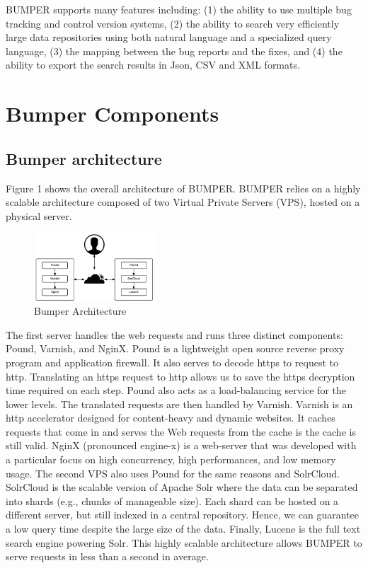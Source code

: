 \documentclass[conference]{IEEEtran}
\begin{document}
BUMPER supports many features including: (1) the ability to use multiple bug tracking and control version systems, (2) the ability to search very efficiently large data repositories using both natural language and a specialized query language, (3) the mapping between the bug reports and the fixes, and (4) the ability to export the search results in Json, CSV and XML formats.

\section{Bumper Components}
\label{sec:Bumper Components}

\subsection{Bumper architecture}
\label{sub:Bumper architecture}

Figure 1 shows the overall architecture of BUMPER. BUMPER relies on a highly scalable architecture composed of two Virtual Private Servers (VPS), hosted on a physical server.

\begin{figure}
  \centering
  \includegraphics[width=0.4\textwidth]{media/archi.png}
  \caption{Bumper Architecture}
\vspace{-1.8em}
\end{figure}

The first server handles the web requests and
runs three distinct components: Pound, Varnish, and NginX.
Pound is a lightweight open source reverse proxy program
and application firewall.
It also serves to decode https to request to http.
Translating an https request to http allows us to save the https decryption time required on each step.
Pound also acts as a load-balancing service for the lower levels.
The translated requests are then handled by Varnish.
Varnish is an http accelerator designed for content-heavy and dynamic websites.
It caches requests that come in and serves the Web requests from the cache is the cache is still valid.
NginX (pronounced engine-x) is a web-server that was developed with a particular focus on high concurrency, high performances, and low memory usage.
The second VPS also uses Pound for the same reasons and SolrCloud.
SolrCloud is the scalable version of Apache Solr where the data can be separated into shards (e.g., chunks of manageable size).
Each shard can be hosted on a different server, but still indexed in a central repository.
Hence, we can guarantee a low query time despite the  large size of the data.
Finally, Lucene is the full text search engine powering Solr.
This highly scalable architecture allows BUMPER to serve requests in less than a second in average.
\end{document}
